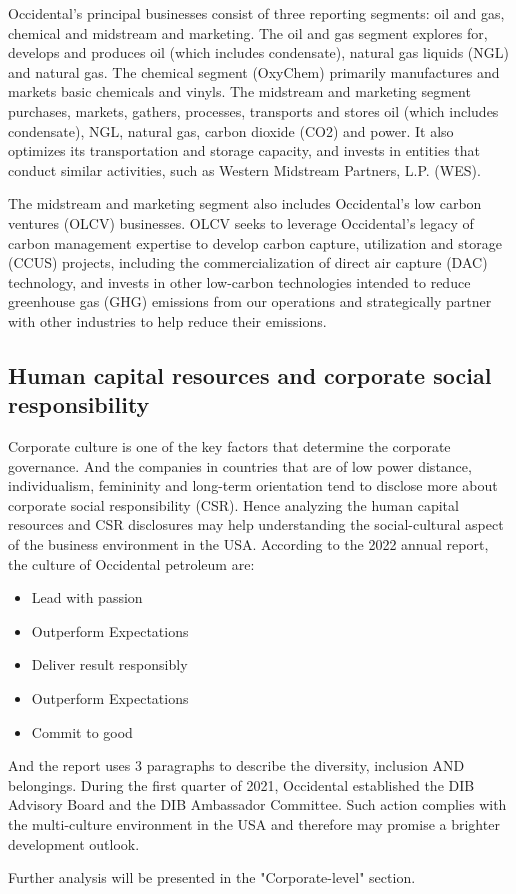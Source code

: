 \documentclass[
	a4paper, %
	12pt,%
]{CSSullivanBusinessReport}
\begin{document}
\begin{fullwidth}
Occidental’s principal businesses consist of three reporting segments: oil and gas, chemical and midstream and
marketing. The oil and gas segment explores for, develops and produces oil (which includes condensate), natural gas
liquids (NGL) and natural gas. The chemical segment (OxyChem) primarily manufactures and markets basic chemicals and
vinyls. The midstream and marketing segment purchases, markets, gathers, processes, transports and stores oil (which
includes condensate), NGL, natural gas, carbon dioxide (CO2) and power. It also optimizes its transportation and storage
capacity, and invests in entities that conduct similar activities, such as Western Midstream Partners, L.P. (WES).
\par
The midstream and marketing segment also includes Occidental’s low carbon ventures (OLCV) businesses. OLCV
seeks to leverage Occidental’s legacy of carbon management expertise to develop carbon capture, utilization and storage
(CCUS) projects, including the commercialization of direct air capture (DAC) technology, and invests in other low-carbon
technologies intended to reduce greenhouse gas (GHG) emissions from our operations and strategically partner with other
industries to help reduce their emissions.\cite{AnnualRepo2021}

\subsection{Human capital resources and corporate social responsibility}
Corporate culture is one of the key factors that determine the corporate governance.\cite{LU2021101264}  And the companies in countries that are of low power distance, individualism, femininity and long-term orientation tend to disclose more about corporate social responsibility (CSR).\cite{SUN2020101256} Hence analyzing the human capital resources and CSR disclosures may help understanding the social-cultural  aspect of the business environment in the USA. According to the 2022 annual report, the culture of Occidental petroleum are:\cite{CodeOfConduct}
\begin{itemize}
    \item Lead with passion
    \item Outperform Expectations
    \item Deliver result responsibly
    \item Outperform Expectations
    \item Commit to good
\end{itemize}
And the report uses 3 paragraphs to describe the diversity, inclusion AND belongings. During the first quarter of 2021, Occidental established the DIB Advisory Board and the DIB Ambassador Committee. Such action complies with the multi-culture environment in the USA and therefore may promise a brighter development outlook.
\par
Further analysis will be presented in the "Corporate-level" section.


\end{fullwidth}
\end{document}
